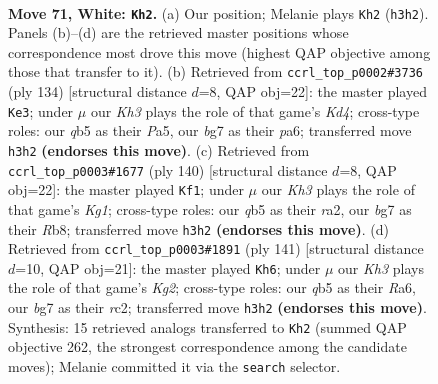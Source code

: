 \documentclass[11pt]{article}
\begin{document}
\clearpage

\begin{figure}[p]\centering
\begin{subfigure}{0.46\textwidth}\centering
\resizebox{\linewidth}{!}{%
\newchessgame
\chessboard[
  setfen={8/3Pkpb1/8/1q6/8/7K/8/8 w - - 5 71},
  showmover=false,
  pgfstyle=straightmove, color=movearrow, markmove={h3-h2}
]}
\caption{}
\end{subfigure}\hfill
\begin{subfigure}{0.46\textwidth}\centering
\resizebox{\linewidth}{!}{%
\newchessgame
\chessboard[
  setfen={8/8/p7/P7/3K1Pkp/8/8/8 w - - 1 68},
  showmover=false,
  pgfstyle=straightmove, color=movearrow, markmove={d4-e3}
]}
\caption{}
\end{subfigure}
\\[4pt]
\begin{subfigure}{0.46\textwidth}\centering
\resizebox{\linewidth}{!}{%
\newchessgame
\chessboard[
  setfen={1R6/8/8/5Pkp/8/8/r7/6K1 w - - 3 71},
  showmover=false,
  pgfstyle=straightmove, color=movearrow, markmove={g1-f1}
]}
\caption{}
\end{subfigure}\hfill
\begin{subfigure}{0.46\textwidth}\centering
\resizebox{\linewidth}{!}{%
\newchessgame
\chessboard[
  setfen={8/6k1/r7/8/7P/6pK/2R5/8 b - - 11 71},
  showmover=false,
  pgfstyle=straightmove, color=movearrow, markmove={g7-h6}
]}
\caption{}
\end{subfigure}
\caption{\textbf{Move 71, White: \texttt{Kh2}.} (a) Our position; Melanie plays \texttt{Kh2} (\texttt{h3h2}). Panels (b)--(d) are the retrieved master positions whose correspondence most drove this move (highest QAP objective among those that transfer to it). (b) Retrieved from \texttt{ccrl\_top\_p0002\#3736} (ply 134) [structural distance $d$=8, QAP obj=22]: the master played \texttt{Ke3}; under $\mu$ our \emph{Kh3} plays the role of that game's \emph{Kd4}; cross-type roles: our \emph{q}b5 as their \emph{P}a5, our \emph{b}g7 as their \emph{p}a6; transferred move \texttt{h3h2} \textbf{(endorses this move)}. (c) Retrieved from \texttt{ccrl\_top\_p0003\#1677} (ply 140) [structural distance $d$=8, QAP obj=22]: the master played \texttt{Kf1}; under $\mu$ our \emph{Kh3} plays the role of that game's \emph{Kg1}; cross-type roles: our \emph{q}b5 as their \emph{r}a2, our \emph{b}g7 as their \emph{R}b8; transferred move \texttt{h3h2} \textbf{(endorses this move)}. (d) Retrieved from \texttt{ccrl\_top\_p0003\#1891} (ply 141) [structural distance $d$=10, QAP obj=21]: the master played \texttt{Kh6}; under $\mu$ our \emph{Kh3} plays the role of that game's \emph{Kg2}; cross-type roles: our \emph{q}b5 as their \emph{R}a6, our \emph{b}g7 as their \emph{r}c2; transferred move \texttt{h3h2} \textbf{(endorses this move)}. Synthesis: 15 retrieved analogs transferred to \texttt{Kh2} (summed QAP objective 262, the strongest correspondence among the candidate moves); Melanie committed it via the \texttt{search} selector.}
\label{fig:thought-m140}
\end{figure}
\end{document}
